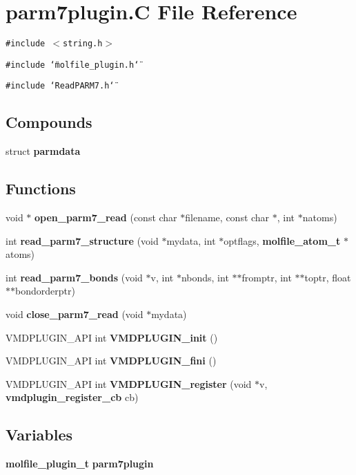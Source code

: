 \section{parm7plugin.C File Reference}
\label{parm7plugin_8C}
{\tt \#include $<$string.h$>$}\par
{\tt \#include \char`\"{}molfile\_\-plugin.h\char`\"{}}\par
{\tt \#include \char`\"{}Read\-PARM7.h\char`\"{}}\par
\subsection*{Compounds}
\begin{CompactItemize}
\item 
struct {\bf parmdata}
\end{CompactItemize}
\subsection*{Functions}
\begin{CompactItemize}
\item 
void $\ast$ {\bf open\_\-parm7\_\-read} (const char $\ast$filename, const char $\ast$, int $\ast$natoms)
\item 
int {\bf read\_\-parm7\_\-structure} (void $\ast$mydata, int $\ast$optflags, {\bf molfile\_\-atom\_\-t} $\ast$atoms)
\item 
int {\bf read\_\-parm7\_\-bonds} (void $\ast$v, int $\ast$nbonds, int $\ast$$\ast$fromptr, int $\ast$$\ast$toptr, float $\ast$$\ast$bondorderptr)
\item 
void {\bf close\_\-parm7\_\-read} (void $\ast$mydata)
\item 
VMDPLUGIN\_\-API int {\bf VMDPLUGIN\_\-init} ()
\item 
VMDPLUGIN\_\-API int {\bf VMDPLUGIN\_\-fini} ()
\item 
VMDPLUGIN\_\-API int {\bf VMDPLUGIN\_\-register} (void $\ast$v, {\bf vmdplugin\_\-register\_\-cb} cb)
\end{CompactItemize}
\subsection*{Variables}
\begin{CompactItemize}
\item 
{\bf molfile\_\-plugin\_\-t} {\bf parm7plugin}
\end{CompactItemize}


